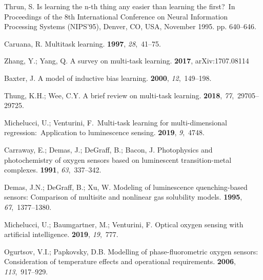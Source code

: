 \documentclass[sensors,article,accept,moreauthors,pdftex,10pt,a4paper]{Definitions/mdpi}
\theoremstyle{definition}
\begin{document}
\begin{thebibliography}{999}
Thrun, S.
\newblock Is learning the n-th thing any easier than learning the first?~\newblock In Proceedings of the 8th International Conference on Neural Information Processing Systems (NIPS'95), Denver, CO, USA, November 1995. pp. 640--646. %

Caruana, R.
\newblock Multitask learning.
 {\bf 1997}, {\em 28},~41--75.

Zhang, Y.; Yang, Q.
\newblock A survey on multi-task learning.
 {\bf 2017}, arXiv:1707.08114

Baxter, J.
\newblock A model of inductive bias learning.
 {\bf 2000}, {\em
  12},~149--198.

Thung, K.H.; Wee, C.Y.
\newblock A brief review on multi-task learning.
 {\bf 2018}, {\em
  77},~29705--29725.

Michelucci, U.; Venturini, F.~\newblock Multi-task learning for multi-dimensional regression:~Application to
  luminescence sensing.
 {\bf 2019}, {\em 9},~4748.

Carraway, E.; Demas, J.; DeGraff, B.; Bacon, J.
\newblock Photophysics and photochemistry of oxygen sensors based on
  luminescent transition-metal complexes.
 {\bf 1991}, {\em 63},~337--342.

Demas, J.N.; DeGraff, B.; Xu, W.
\newblock Modeling of luminescence quenching-based sensors: Comparison of
  multisite and nonlinear gas solubility models.
 {\bf 1995}, {\em 67},~1377--1380.

Michelucci, U.; Baumgartner, M.; Venturini, F.
\newblock Optical oxygen sensing with artificial intelligence.
 {\bf 2019}, {\em 19},~777.

Ogurtsov, V.I.; Papkovsky, D.B.
\newblock Modelling of phase-fluorometric oxygen sensors: Consideration of
  temperature effects and operational requirements.
 {\bf 2006}, {\em
  113},~917--929.


\end{thebibliography}
\end{document}
